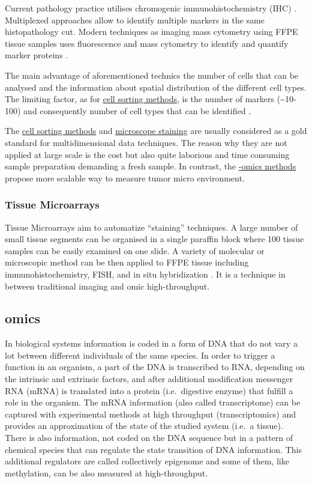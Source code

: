 \documentclass[12pt,]{book}
\theoremstyle{definition}
\theoremstyle{definition}
\theoremstyle{definition}
\theoremstyle{remark}
\begin{document}
Current pathology practice utilises chromogenic immunohistochemistry
(IHC) \citep{RamosVara2010}. Multiplexed approaches allow to identify
multiple markers in the same histopathology cut. Modern techniques as
imaging mass cytometry using FFPE tissue samples uses fluorescence and
mass cytometry to identify and quantify marker proteins
\citep{Giesen2014}.

The main advantage of aforementioned technics the number of cells that
can be analysed and the information about spatial distribution of the
different cell types. The limiting factor, as for
\protect\hyperlink{facs}{cell sorting methods}, is the number of markers
(\textasciitilde{}10-100) and consequently number of cell types that can
be identified \citep{Schelker2017}.

The \protect\hyperlink{facs}{cell sorting methods} and
\protect\hyperlink{staining}{microscope staining} are usually considered
as a gold standard for multidimensional data techniques. The reason why
they are not applied at large scale is the cost but also quite laborious
and time consuming sample preparation demanding a fresh sample. In
contrast, the \protect\hyperlink{omics}{-omics methods} propose more
scalable way to measure tumor micro environment.

\hypertarget{tissue-microarrays}{%
\subsubsection{Tissue Microarrays}\label{tissue-microarrays}}

Tissue Microarrays aim to automatize ``staining'' techniques. A large
number of small tissue segments can be organised in a single paraffin
block where 100 tissue samples can be easily examined on one slide. A
variety of molecular or microscopic method can be then applied to FFPE
tissue including immunohistochemistry, FISH, and in situ hybridization
\citep{Wilczynski2009}. It is a technique in between traditional imaging
and omic high-throughput.

\hypertarget{omics}{%
\subsection{omics}\label{omics}}

In biological systems information is coded in a form of DNA that do not
vary a lot between different individuals of the same species. In order
to trigger a function in an organism, a part of the DNA is transcribed
to RNA, depending on the intrinsic and extrinsic factors, and after
additional modification messenger RNA (mRNA) is translated into a
protein (i.e.~digestive enzyme) that fulfill a role in the organism. The
mRNA information (also called transcriptome) can be captured with
experimental methods at high throughput (transcriptomics) and provides
an approximation of the state of the studied system (i.e.~a tissue).
There is also information, not coded on the DNA sequence but in a
pattern of chemical species that can regulate the state transition of
DNA information. This additional regulators are called collectively
epigenome and some of them, like methylation, can be also measured at
high-throughput.
\end{document}

